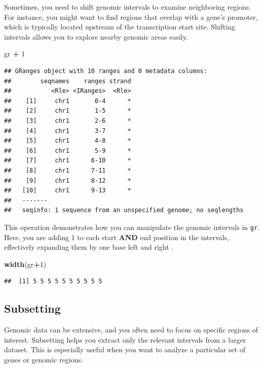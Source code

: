 \documentclass[
]{book}
\newenvironment{Shaded}{\begin{snugshade}}{\end{snugshade}}
\newcommand{\DecValTok}[1]{\textcolor[rgb]{0.00,0.00,0.81}{#1}}
\newcommand{\FunctionTok}[1]{\textcolor[rgb]{0.13,0.29,0.53}{\textbf{#1}}}
\newcommand{\NormalTok}[1]{#1}
\newcommand{\SpecialCharTok}[1]{\textcolor[rgb]{0.81,0.36,0.00}{\textbf{#1}}}
\begin{document}
Sometimes, you need to shift genomic intervals to examine neighboring regions. For instance, you might want to find regions that overlap with a gene's promoter, which is typically located upstream of the transcription start site. Shifting intervals allows you to explore nearby genomic areas easily.

\begin{Shaded}
\begin{Highlighting}[]
\NormalTok{gr }\SpecialCharTok{+} \DecValTok{1}
\end{Highlighting}
\end{Shaded}

\begin{verbatim}
## GRanges object with 10 ranges and 0 metadata columns:
##        seqnames    ranges strand
##           <Rle> <IRanges>  <Rle>
##    [1]     chr1       0-4      *
##    [2]     chr1       1-5      *
##    [3]     chr1       2-6      *
##    [4]     chr1       3-7      *
##    [5]     chr1       4-8      *
##    [6]     chr1       5-9      *
##    [7]     chr1      6-10      *
##    [8]     chr1      7-11      *
##    [9]     chr1      8-12      *
##   [10]     chr1      9-13      *
##   -------
##   seqinfo: 1 sequence from an unspecified genome; no seqlengths
\end{verbatim}

This operation demonstrates how you can manipulate the genomic intervals in \texttt{gr}. Here, you are adding 1 to each start \textbf{AND} end position in the intervals, effectively expanding them by one base left and right .

\begin{Shaded}
\begin{Highlighting}[]
\FunctionTok{width}\NormalTok{(gr}\SpecialCharTok{+}\DecValTok{1}\NormalTok{)}
\end{Highlighting}
\end{Shaded}

\begin{verbatim}
##  [1] 5 5 5 5 5 5 5 5 5 5
\end{verbatim}

\hypertarget{subsetting}{%
\subsection{Subsetting}\label{subsetting}}

Genomic data can be extensive, and you often need to focus on specific regions of interest. Subsetting helps you extract only the relevant intervals from a larger dataset. This is especially useful when you want to analyze a particular set of genes or genomic regions.
\end{document}
